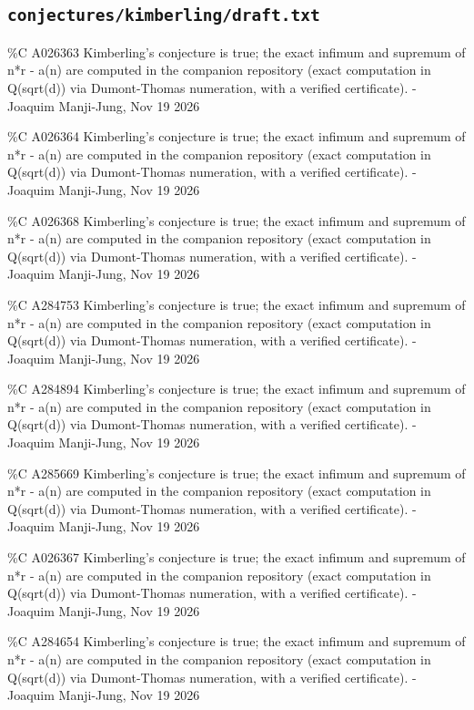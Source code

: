 \subsection*{\texttt{conjectures/kimberling/draft.txt}}
{\small\raggedright\ttfamily
\%C A026363 Kimberling's conjecture is true; the exact infimum and supremum of n*r - a(n) are computed in the companion repository (exact computation in Q(sqrt(d)) via Dumont-Thomas numeration, with a verified certificate). - Joaquim Manji-Jung, Nov 19 2026\par
\%C A026364 Kimberling's conjecture is true; the exact infimum and supremum of n*r - a(n) are computed in the companion repository (exact computation in Q(sqrt(d)) via Dumont-Thomas numeration, with a verified certificate). - Joaquim Manji-Jung, Nov 19 2026\par
\%C A026368 Kimberling's conjecture is true; the exact infimum and supremum of n*r - a(n) are computed in the companion repository (exact computation in Q(sqrt(d)) via Dumont-Thomas numeration, with a verified certificate). - Joaquim Manji-Jung, Nov 19 2026\par
\%C A284753 Kimberling's conjecture is true; the exact infimum and supremum of n*r - a(n) are computed in the companion repository (exact computation in Q(sqrt(d)) via Dumont-Thomas numeration, with a verified certificate). - Joaquim Manji-Jung, Nov 19 2026\par
\%C A284894 Kimberling's conjecture is true; the exact infimum and supremum of n*r - a(n) are computed in the companion repository (exact computation in Q(sqrt(d)) via Dumont-Thomas numeration, with a verified certificate). - Joaquim Manji-Jung, Nov 19 2026\par
\%C A285669 Kimberling's conjecture is true; the exact infimum and supremum of n*r - a(n) are computed in the companion repository (exact computation in Q(sqrt(d)) via Dumont-Thomas numeration, with a verified certificate). - Joaquim Manji-Jung, Nov 19 2026\par
\%C A026367 Kimberling's conjecture is true; the exact infimum and supremum of n*r - a(n) are computed in the companion repository (exact computation in Q(sqrt(d)) via Dumont-Thomas numeration, with a verified certificate). - Joaquim Manji-Jung, Nov 19 2026\par
\%C A284654 Kimberling's conjecture is true; the exact infimum and supremum of n*r - a(n) are computed in the companion repository (exact computation in Q(sqrt(d)) via Dumont-Thomas numeration, with a verified certificate). - Joaquim Manji-Jung, Nov 19 2026\par
}
